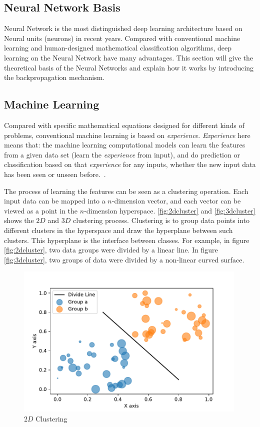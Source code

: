 \begin{spacing}{1.5}
\section{Neural Network Basis}
\label{sec:LR_NNB}

Neural Network is the most distinguished deep learning architecture based on Neural units (neurons) in recent years. Compared with conventional machine learning and human-designed mathematical classification algorithms, deep learning on the Neural Network have many advantages. This section will give the theoretical basis of the Neural Networks and explain how it works by introducing the backpropagation mechanism.

\subsection{Machine Learning}

Compared with specific mathematical equations designed for different kinds of problems, conventional machine learning is based on \textit{experience}. \textit{Experience} here means that: the machine learning computational models can learn the features from a given data set (learn the \textit{experience} from input), and do prediction or classification based on that \textit{experience} for any inputs, whether the new input data has been seen or unseen before.~\cite{mohri2018foundations}.

The process of learning the features can be seen as a clustering operation. Each input data can be mapped into a $n$-dimension vector, and each vector can be viewed as a point in the $n$-dimension hyperspace. \autoref{fig:2dcluster} and \autoref{fig:3dcluster} shows the $2D$ and $3D$ clustering process. Clustering is to group data points into different clusters in the hyperspace and draw the hyperplane between such clusters. This hyperplane is the interface between classes. For example, in figure \autoref{fig:2dcluster}, two data groups were divided by a linear line. In figure \autoref{fig:3dcluster}, two groups of data were divided by a non-linear curved surface.

\begin{figure}[ht]
\centering
\includegraphics[width=0.99\textwidth, fbox]{Chapter2/2dcluster.pdf}
\caption{$2D$ Clustering}
\label{fig:2dcluster} 
\end{figure}


\end{spacing}
